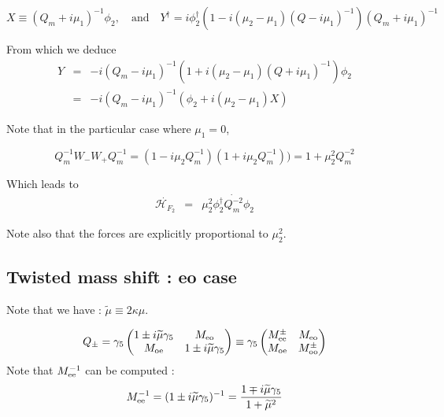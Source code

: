 \documentclass{article}[12pt]
\begin{document}
\begin{equation}
X\equiv (Q_m+i\mu_1)^{-1}\phi_2,\quad\textrm{and}\quad Y^{\dagger}=i\phi_2^\dagger
(1 -i (\mu_2-\mu_1) (Q-i\mu_1)^{-1}) (Q_m+i\mu_1)^{-1}
\end{equation}

From which we deduce
\begin{eqnarray}
Y &=&   -i (Q_m - i \mu_1)^{-1}(1 +  i(\mu_2-\mu_1)(Q+i\mu_1)^{-1})
\phi_2 \\ &=&-i (Q_m - i \mu_1)^{-1}  ( \phi_2  + i(\mu_2-\mu_1)  X)
\end{eqnarray}


Note that in the particular case where $\mu_1=0$,

\begin{equation}
Q_m^{-1} W_- W_+ Q_m^{-1} = ( 1 - i\mu_2Q_m^{-1}) (1+ i\mu_2Q_m^{-1}))
= 1 + \mu_2^2 Q_m^{-2}
\end{equation}

Which leads to
\begin{eqnarray}
 \dot{\mathcal{H}_{F_2}}  &=& \mu_2^2 \phi_2^{\dagger} \dot{Q_m^{-2}} \phi_2
\end{eqnarray}

Note also that the forces are explicitly
proportional to $\mu_2^2$.

\subsection{Twisted mass shift : eo case}

Note that we have : $\widetilde{\mu} \equiv 2 \kappa \mu$.

\begin{equation}
Q_{\pm}= \gamma_5 \begin{pmatrix}
1 \pm i \widetilde{\mu} \gamma_5 & M_{\rm{eo}} \\
M_{\rm{oe}} & 1 \pm i \widetilde{\mu} \gamma_5\\
\end{pmatrix} \equiv \gamma_5 \begin{pmatrix}
M^{\pm}_{\rm{ee}}  & M_{\rm{eo}} \\
M_{\rm{oe}} & M^{\pm}_{\rm{oo}}\\
\end{pmatrix}
\end{equation}
Note that $M_{\rm{ee}}^{-1}$ can be computed :
\begin{equation}
M_{\rm{ee}}^{-1} = ( 1 \pm i\widetilde{\mu} \gamma_5)^{-1} = \frac{1\mp
i \widetilde{\mu}\gamma_5 }{ 1 + \widetilde{\mu}^2}
\end{equation}
\end{document}

